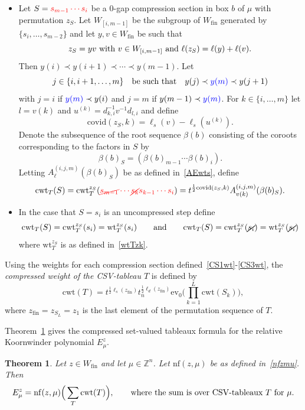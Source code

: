 \documentclass[11pt]{article}
\theoremstyle{plain}
\newtheorem{thm}{Theorem}[section]
\theoremstyle{definition}
\theoremstyle{remark}
\numberwithin{equation}{section}
\def\ZZ{\mathbb{Z}}
\def\ev{\mathrm{ev}}
\def\wt{\mathrm{wt}}
\newcounter{r}
\newcounter{s}
\begin{document}
\begin{itemize}
\item[(CS2)] 
Let $S={\color{red} s_{m-1}\cdots s_{i}}$ be a $0$-gap compression section in box $b$ of $\mu$ with permutation $z_S$.
Let $W_{[i,m-1]}$ be the subgroup of $W_{\mathrm{fin}}$ generated by $\{s_i, \ldots, s_{m-2} \}$ and let $y,v\in W_{\mathrm{fin}}$ be such that
$$\hbox{$z_S = yv$ with $v\in W_{[i,m-1]}$ and $\ell(z_S) = \ell(y)+\ell(v).$}$$
Then $y(i)\prec y(i+1)\prec \cdots \prec y(m-1)$. Let
$$j \in \{i, i+1, \ldots, m\}\quad\hbox{be such that}\quad
y(j) \prec {\color{blue}y(m)} \prec y(j+1)
$$
with $j=i$ if ${\color{blue} y(m)}\prec y(i)$ and $j=m$ if $y(m-1)\prec {\color{blue} y(m)}$.
For $k\in \{i, \ldots, m\}$ let $l = v(k)$ and $u^{(k)} = d_{k,i}^{-1}v^{-1}d_{l,i}$ and define
$$\mathrm{covid}(z_S,k) = \ell_s(v)-\ell_s(u^{(k)}).$$
Denote the subsequence of the root sequence $\beta(b)$ consisting of the coroots  corresponding to the factors in $S$ by
$$\beta(b)_S = (\beta(b)_{m-1}\cdots \beta(b)_i).$$ 
Letting $A^{(i,j,m)}_\ell(\beta(b)_S)$ be as defined in~\eqref{AEwts}, define
\begin{equation}
\mathrm{cwt}_T(S) = \mathrm{cwt}^{z_S}_T({\color{red} \cancel{s_{m-1}}\cdots \cancel{s_k} s_{k-1} \cdots s_{i}}) = 
t^{\frac12\mathrm{covid}(z_S,k)}A^{(i,j,m)}_{v(k)}(\beta(b)_S).
\label{CS2wt}
\end{equation}

\item[(CS3)] In the case that $S = s_i$ is an uncompressed step define
\begin{equation}
\mathrm{cwt}_T(S) = \mathrm{cwt}_T^{z_S}(s_i) = \wt_T^{z_S}(s_i)
\qquad\hbox{and}\qquad
\mathrm{cwt}_T(S) = \mathrm{cwt}_T^{z_S}(\cancel{s_i}) = \wt_T^{z_S}(\cancel{s_i})
\label{CS3wt}
\end{equation}
where $\wt_T^{z_S}$ is as defined in~\eqref{wtTzk}.
\end{itemize}

Using the weights for each compression section defined~\eqref{CS1wt}-\eqref{CS3wt}, 
the \emph{compressed weight of the CSV-tableau $T$} is defined by
$$\mathrm{cwt}(T) = t^{\frac12\ell_s(z_{\mathrm{fin}}) }t_n^{\frac12\ell_d(z_{\mathrm{fin}})} \ev_0\Big(\prod_{k=1}^L \mathrm{cwt}(S_k)\Big),
$$
where $z_{\mathrm{fin}}=z_{S_L}=z_1$ is the last element of the permutation sequence of $T$.


Theorem~\ref{CSVformula} gives the compressed set-valued tableaux formula for the relative Koornwinder
polynomial $E^z_\mu$.


\begin{thm} 
\label{CSVformula}
Let $z\in W_{\mathrm{fin}}$ and let $\mu\in \ZZ^n$.  Let $\mathrm{nf}(z,\mu)$ be as defined in~\eqref{nfzmu}.  
Then
$$
E^z_\mu = \mathrm{nf}(z,\mu)\Big(\sum_T \mathrm{cwt}(T)\Big),
\qquad\hbox{where the sum is over CSV-tableaux $T$ for $\mu$.}
$$
\end{thm}
\end{document}
